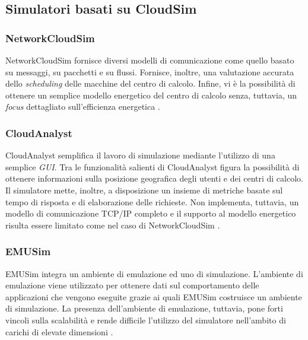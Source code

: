 {\subsection{Simulatori basati su CloudSim}
\subsubsection{NetworkCloudSim}
NetworkCloudSim  \cite{garg2011networkcloudsim} fornisce diversi modelli di comunicazione come quello basato su messaggi, su pacchetti e su flussi. Fornisce, inoltre, una valutazione accurata dello \emph{scheduling} delle macchine del centro di calcolo. Infine, vi è la possibilità di ottenere un semplice modello energetico del centro di calcolo senza, tuttavia, un \emph{focus} dettagliato sull'efficienza energetica \cite{mansouri2020cloud}.
\subsubsection*{CloudAnalyst}
CloudAnalyst \cite{wickremasinghe2010cloudanalyst} semplifica il lavoro di simulazione mediante l'utilizzo di una semplice \emph{GUI}. Tra le funzionalità salienti di CloudAnalyst figura la possibilità di ottenere informazioni sulla posizione geografica degli utenti e dei centri di calcolo. Il simulatore mette, inoltre, a disposizione un insieme di metriche basate sul tempo di risposta e di elaborazione delle richieste. Non implementa, tuttavia, un modello di comunicazione TCP/IP completo e il supporto al modello energetico risulta essere limitato come nel caso di NetworkCloudSim \cite{mansouri2020cloud}. 
\subsubsection{EMUSim}
EMUSim \cite{calheiros2013emusim} integra un ambiente di emulazione ed uno di simulazione. L'ambiente di emulazione viene utilizzato per ottenere dati sul comportamento delle applicazioni che vengono eseguite grazie ai quali EMUSim costruisce un ambiente di simulazione. La presenza dell'ambiente di emulazione, tuttavia, pone forti vincoli sulla scalabilità e rende difficile l'utilizzo del simulatore nell'ambito di carichi di elevate dimensioni \cite{mansouri2020cloud}. 
}

